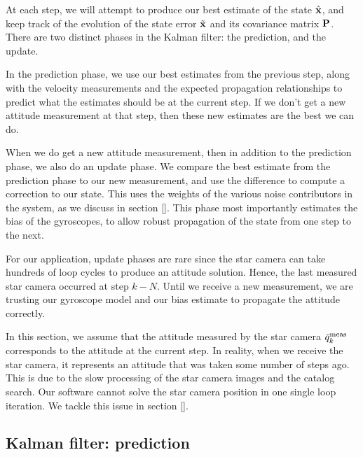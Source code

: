 At each step, we will attempt to produce our best estimate of the state $\hat{\textrm{\textbf{x}}}$, and keep track of the evolution of the state error $\tilde{\textrm{\textbf{x}}}$ and its covariance matrix $\textrm{\textbf{P}}$. There are two distinct phases in the Kalman filter: the prediction, and the update.

In the prediction phase, we use our best estimates from the previous step, along with the velocity measurements and the expected propagation relationships to predict what the estimates should be at the current step. If we don't get a new attitude measurement at that step, then these new estimates are the best we can do.

When we do get a new attitude measurement, then in addition to the prediction phase, we also do an update phase. We compare the best estimate from the prediction phase to our new measurement, and use the difference to compute a correction to our state. This uses the weights of the various noise contributors in the system, as we discuss in section []. This phase most importantly estimates the bias of the gyroscopes, to allow robust propagation of the state from one step to the next.

For our application, update phases are rare since the star camera can take hundreds of loop cycles to produce an attitude solution. Hence, the last measured star camera occurred at step $k-N$. Until we receive a new measurement, we are trusting our gyroscope model and our bias estimate to propagate the attitude correctly.

In this section, we assume that the attitude measured by the star camera $\bar{q}^{\textrm{meas}}_k$ corresponds to the attitude at the current step. In reality, when we receive the star camera, it represents an attitude that was taken some number of steps ago. This is due to the slow processing of the star camera images and the catalog search. Our software cannot solve the star camera position in one single loop iteration. We tackle this issue in section []. 

\subsection{Kalman filter: prediction}


